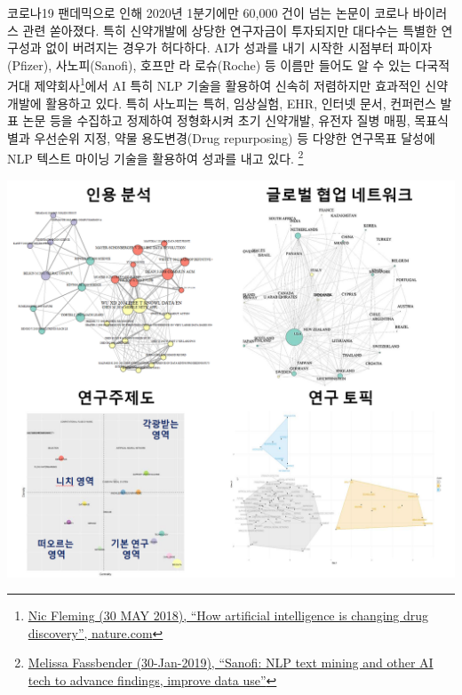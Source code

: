 \documentclass[smallextended]{svjour3}       %
\begin{document}
코로나19 팬데믹으로 인해 2020년 1분기에만 60,000 건이 넘는 논문이 코로나
바이러스 관련 쏟아졌다. 특히 신약개발에 상당한 연구자금이 투자되지만
대다수는 특별한 연구성과 없이 버려지는 경우가 허다하다. AI가 성과를 내기
시작한 시점부터 파이자(Pfizer), 사노피(Sanofi), 호프만 라 로슈(Roche) 등
이름만 들어도 알 수 있는 다국적 거대 제약회사\footnote{\href{https://www.nature.com/articles/d41586-018-05267-x}{Nic
  Fleming (30 MAY 2018), ``How artificial intelligence is changing drug
  discovery'', nature.com}}에서 AI 특히 NLP 기술을 활용하여 신속히
저렴하지만 효과적인 신약개발에 활용하고 있다. 특히 사노피는 특허,
임상실험, EHR, 인터넷 문서, 컨퍼런스 발표 논문 등을 수집하고 정제하여
정형화시켜 초기 신약개발, 유전자 질병 매핑, 목표식별과 우선순위 지정,
약물 용도변경(Drug repurposing) 등 다양한 연구목표 달성에 NLP 텍스트
마이닝 기술을 활용하여 성과를 내고 있다. \footnote{\href{https://www.outsourcing-pharma.com/Article/2019/01/30/Sanofi-NLP-text-mining-and-other-AI-tech-to-advance-findings-improve-data-use}{Melissa
  Fassbender (30-Jan-2019), ``Sanofi: NLP text mining and other AI tech
  to advance findings, improve data use''}}

\includegraphics{fig/nlp-rnd-showcase.png}




\end{document}
